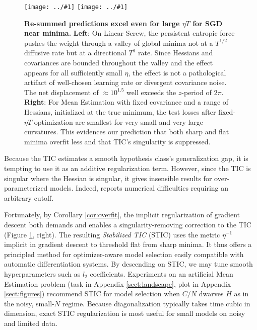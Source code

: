 \documentclass{article}
\theoremstyle{plain}
\theoremstyle{definition}
\newcommand{\plotmoow}[3]{\texttt{[image: ../\#1]}}
\begin{document}
        \begin{figure}[h!] 
            \centering
            \plotmoow{plots/new-thermo-linear-screw}{0.48\columnwidth}{4.0cm}
            \plotmoow{plots/new-tak}{0.48\columnwidth}{4.0cm}
            \caption{
                {\bf Re-summed predictions excel even for large $\eta T$ for
                SGD near minima.}
                {\bf Left}: On Linear Screw, the persistent entropic force
                pushes the weight through a valley of global minima not at a
                $T^{1/2}$ diffusive rate but at a directional $T^1$ rate.
                Since Hessians and covariances are bounded throughout
                the valley and the effect appears for all sufficiently small
                $\eta$, the effect is not a pathological artifact of
                well-chosen learning rate or divergent covariance noise.  The
                net displacement of $\approx 10^{1.5}$ well exceeds the
                $z$-period of $2\pi$. 
                {\bf Right}: For Mean Estimation with fixed covariance and a
                range of Hessians, initialized at the true minimum, the test
                losses after fixed-$\eta T$ optimization are smallest for very
                small and very large curvatures.  This evidences our prediction
                that both sharp and flat minima overfit less and that TIC's
                singularity is suppressed.
            }
            \label{fig:thermoandtak}
        \end{figure}

        Because the TIC estimates a smooth hypothesis class's generalization
        gap, it is tempting to use it as an additive regularization term.
        However, since the TIC is singular where the Hessian is singular, it
        gives insensible results for over-parameterized models.  Indeed,
        \citet{di18} reports numerical difficulties requiring an arbitrary
        cutoff. 

        Fortunately, by Corollary \ref{cor:overfit}, the implicit
        regularization of gradient descent both demands and enables a
        singularity-removing correction to the TIC (Figure
        \ref{fig:thermoandtak}, right).  
        The resulting \emph{Stabilized TIC} (STIC) uses the metric $\eta^{-1}$
        implicit in gradient descent to threshold flat from sharp minima.
        It thus offers a principled method for
        optimizer-aware model selection easily compatible with automatic
        differentiation systems.  By descending on STIC, we may tune smooth
        hyperparameters such as $l_2$ coefficients.  Experiments on an
        artificial Mean Estimation problem (task in Appendix
        \ref{sect:landscape}, plot in Appendix \ref{sect:figures}) recommend
        STIC for model selection when $C/N$ dwarves $H$ as in the
        noisy, small-$N$ regime.  Because diagonalization typically takes time
        cubic in dimension, exact STIC regularization is most useful for small
        models on noisy and limited data.
\end{document}
